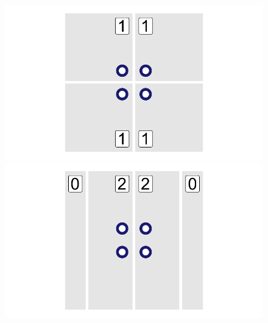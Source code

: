 \begin{figure}[htb] %
    \centering %
    \begin{minipage}[b]{.32\linewidth} %
        \includegraphics[width=\linewidth,trim={0.5cm 0.5cm 0.5cm 0.5cm},clip]{body/figures/41-maup_1.pdf} %
    \end{minipage} %
    \hfill
    \begin{minipage}[b]{.32\linewidth}
       \includegraphics[width=\linewidth,trim={0.5cm 0.5cm 0.5cm 0.5cm},clip]{body/figures/42-maup_2.pdf}

\end{minipage}
\end{figure}
